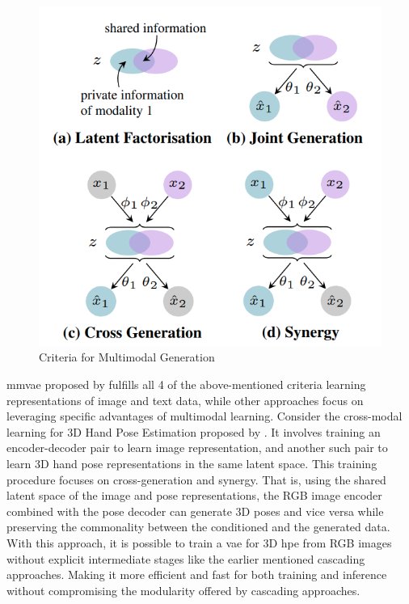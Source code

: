 \begin{figure}[h]
    \centering
    \includegraphics[scale=0.5]{figures/background/criteria.png}
    \caption{Criteria for Multimodal Generation \cite{MMVAE}}
    \label{fig:criteria}
\end{figure}

\ac{mmvae} proposed by \cite{MMVAE} fulfills all 4 of the above-mentioned criteria learning representations of image and text data, while other approaches focus on leveraging specific advantages of multimodal learning. Consider the cross-modal learning for 3D Hand Pose Estimation proposed by \cite{crossmodal}. It involves training an encoder-decoder pair to learn image representation, and another such pair to learn 3D hand pose representations in the same latent space. This training procedure focuses on cross-generation and synergy. That is, using the shared latent space of the image and pose representations, the RGB image encoder combined with the pose decoder can generate 3D poses and vice versa while preserving the commonality between the conditioned and the generated data. With this approach, it is possible to train a \ac{vae} for 3D \ac{hpe} from RGB images without explicit intermediate stages like the earlier mentioned cascading approaches. Making it more efficient and fast for both training and inference without compromising the modularity offered by cascading approaches.

